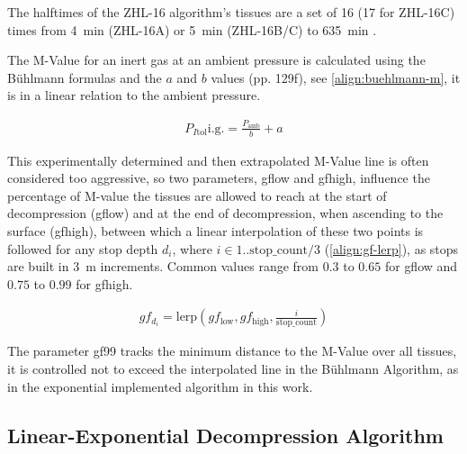 The halftimes of the ZHL-16 algorithm's tissues are a set of 16 (17 for ZHL-16C) times from \SI{4}{\minute} (ZHL-16A) or \SI{5}{\minute} (ZHL-16B/C) to \SI{635}{\minute} \cite{tauchmedizin-2002}.

The M-Value for an inert gas at an ambient pressure is calculated using the Bühlmann formulas and the $a$ and $b$ values \cite{tauchmedizin-2002} (pp. 129f), see \ref{align:buehlmann-m}, it is in a linear relation to the ambient pressure.

\begin{align}
    P_{I\mathrm{tol}} \mathrm{i.g.} = \frac{P_{\mathrm{amb}}}{b} + a \label{align:buehlmann-m}
\end{align}

This experimentally determined and then extrapolated M-Value line is often considered too aggressive, so two parameters, \gls{gflow} and \gls{gfhigh}, influence the percentage of M-value the tissues are allowed to reach at the start of decompression (\gls{gflow}) and at the end of decompression, when ascending to the surface (\gls{gfhigh}), between which a linear interpolation of these two points is followed for any stop depth $d_i$, where $i \in 1..\mathrm{stop\_count}/3$ (\ref{align:gf-lerp}), as stops are built in \SI{3}{\meter} increments.
Common values range from $0.3$ to $0.65$ for \gls{gflow} and $0.75$ to $0.99$ for \gls{gfhigh}.

\begin{align}
    gf_{d_i} = \mathrm{lerp}(gf_{\mathrm{low}}, gf_{\mathrm{high}}, \frac{i}{\mathrm{stop\_count}}) \label{align:gf-lerp}
\end{align}

The parameter \gls{gf99} tracks the minimum distance to the M-Value over all tissues, it is controlled not to exceed the interpolated line in the Bühlmann Algorithm, as in the exponential implemented algorithm in this work.

\subsection{Linear-Exponential Decompression Algorithm}

